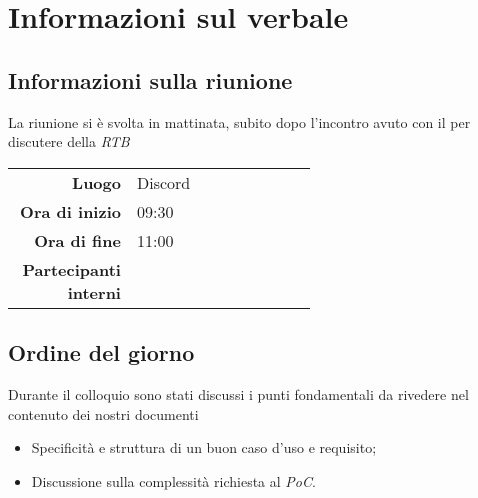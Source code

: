 \section{Informazioni sul verbale}

\subsection{Informazioni sulla riunione}
La riunione si è svolta in mattinata, subito dopo l'incontro avuto con il \cardin per discutere della \textit{RTB}

\begin{center}
	\begin{tabular}{r|p{0.6\linewidth}}
		\toprule
		\textbf{Luogo} & Discord \\
		\textbf{Ora di inizio} & 09:30 \\
		\textbf{Ora di fine} & 11:00 \\
		\textbf{Partecipanti interni} & \groupTeam
	\end{tabular}
\end{center}

\medskip

\subsection{Ordine del giorno}
Durante il colloquio sono stati discussi i punti fondamentali da rivedere nel contenuto dei nostri documenti
\begin{itemize}
	\item Specificità e struttura di un buon caso d'uso e requisito;
	\item Discussione sulla complessità richiesta al \textit{PoC}.
\end{itemize}